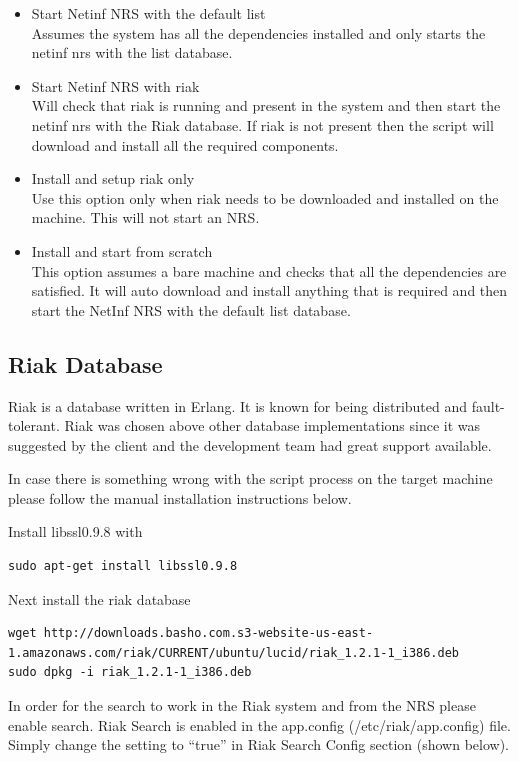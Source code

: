\begin{itemize}
\item Start Netinf NRS with the default list\\
Assumes the system has all the dependencies installed and only starts the netinf nrs with the list database.
\item Start Netinf NRS with riak\\
Will check that riak is running and present in the system and then start the netinf nrs with the Riak database.
If riak is not present then the script will download and install all the required components. 
\item Install and setup riak only\\
Use this option only when riak needs to be downloaded and installed on the machine. This will not start an NRS.
\item Install and start from scratch\\
This option assumes a bare machine and checks that all the dependencies are satisfied. It will auto download and install anything that is required and then start the NetInf NRS with the default list database. 
\end{itemize}


\subsection{Riak Database}

Riak is a database written in Erlang. It is known for being distributed and fault-tolerant. Riak was chosen above other database implementations since it was suggested by the client and the development team had great support available. 

In case there is something wrong with the script process on the target machine please follow the manual installation instructions below.

Install libssl0.9.8 with
\begin {verbatim}
sudo apt-get install libssl0.9.8
\end{verbatim}

Next install the riak database
\begin{verbatim}
wget http://downloads.basho.com.s3-website-us-east-1.amazonaws.com/riak/CURRENT/ubuntu/lucid/riak_1.2.1-1_i386.deb
sudo dpkg -i riak_1.2.1-1_i386.deb
\end{verbatim}

In order for the search to work in the Riak system and from the NRS please enable search.
Riak Search is enabled in the app.config (/etc/riak/app.config) file. Simply change the setting to “true” in Riak Search Config section (shown below).

